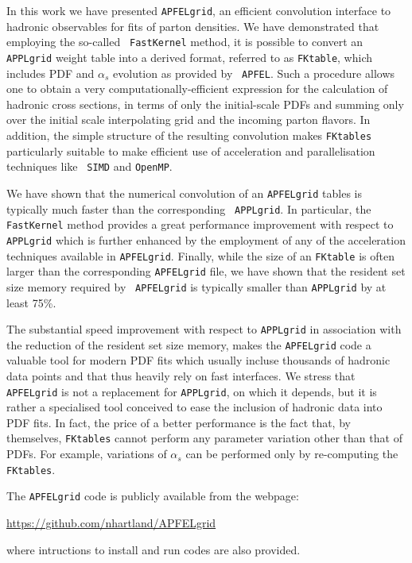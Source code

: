 \documentclass[preprint,12pt]{elsarticle}
\begin{document}
In this work we have presented {\tt APFELgrid}, an efficient
convolution interface to hadronic observables for fits of parton
densities. We have demonstrated that employing the so-called {\tt
  FastKernel} method, it is possible to convert an {\tt APPLgrid}
weight table into a derived format, referred to as {\tt FKtable},
which includes PDF and $\alpha_s$ evolution as provided by {\tt
  APFEL}.  Such a procedure allows one to obtain a very
computationally-efficient expression for the calculation of hadronic
cross sections, in terms of only the initial-scale PDFs and summing
only over the initial scale interpolating grid and the incoming parton
flavors. In addition, the simple structure of the resulting
convolution makes {\tt FKtables} particularly suitable to make
efficient use of acceleration and parallelisation techniques like {\tt
  SIMD} and {\tt OpenMP}.

We have shown that the numerical convolution of an {\tt APFELgrid}
tables is typically much faster than the corresponding {\tt
  APPLgrid}. In particular, the {\tt FastKernel} method provides a
great performance improvement with respect to {\tt APPLgrid} which is
further enhanced by the employment of any of the acceleration
techniques available in {\tt APFELgrid}. Finally, while the size of an
{\tt FKtable} is often larger than the corresponding {\tt APFELgrid}
file, we have shown that the resident set size memory required by {\tt
  APFELgrid} is typically smaller than {\tt APPLgrid} by at least
75\%.

The substantial speed improvement with respect to {\tt APPLgrid} in
association with the reduction of the resident set size memory, makes
the {\tt APFELgrid} code a valuable tool for modern PDF fits which
usually incluse thousands of hadronic data points and that thus
heavily rely on fast interfaces. We stress that {\tt APFELgrid} is not
a replacement for {\tt APPLgrid}, on which it depends, but it is
rather a specialised tool conceived to ease the inclusion of hadronic
data into PDF fits. In fact, the price of a better performance is the
fact that, by themselves, {\tt FKtables} cannot perform any parameter
variation other than that of PDFs. For example, variations of
$\alpha_s$ can be performed only by re-computing the {\tt FKtables}.

The {\tt APFELgrid} code is publicly available from the webpage:
\begin{center}
\url{https://github.com/nhartland/APFELgrid}
\end{center}
where intructions to install and run codes are also provided.
\end{document}
